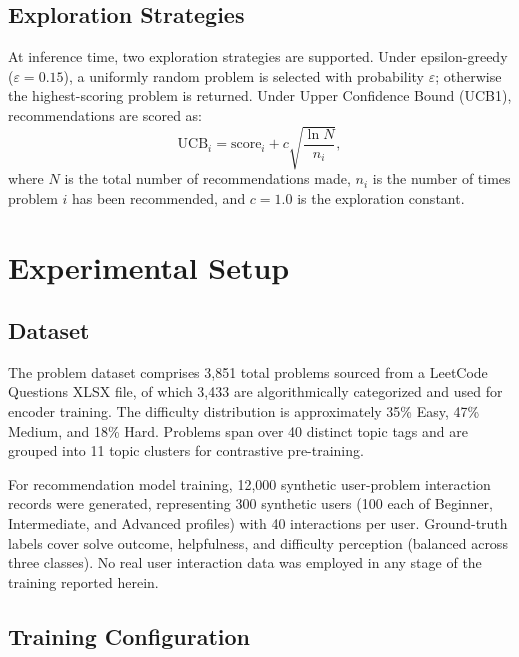 \documentclass[12pt]{article}
\begin{document}
\subsection{Exploration Strategies}

At inference time, two exploration strategies are supported. Under epsilon-greedy ($\varepsilon = 0.15$), a uniformly random problem is selected with probability $\varepsilon$; otherwise the highest-scoring problem is returned. Under Upper Confidence Bound (UCB1), recommendations are scored as:
\begin{equation}
\text{UCB}_i = \text{score}_i + c\sqrt{\frac{\ln N}{n_i}},
\end{equation}
where $N$ is the total number of recommendations made, $n_i$ is the number of times problem $i$ has been recommended, and $c = 1.0$ is the exploration constant.

\section{Experimental Setup}

\subsection{Dataset}

The problem dataset comprises 3,851 total problems sourced from a LeetCode Questions XLSX file, of which 3,433 are algorithmically categorized and used for encoder training. The difficulty distribution is approximately 35\% Easy, 47\% Medium, and 18\% Hard. Problems span over 40 distinct topic tags and are grouped into 11 topic clusters for contrastive pre-training.

For recommendation model training, 12,000 synthetic user-problem interaction records were generated, representing 300 synthetic users (100 each of Beginner, Intermediate, and Advanced profiles) with 40 interactions per user. Ground-truth labels cover solve outcome, helpfulness, and difficulty perception (balanced across three classes). No real user interaction data was employed in any stage of the training reported herein.

\subsection{Training Configuration}
\end{document}
